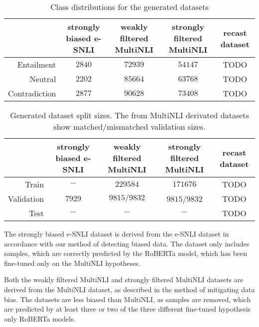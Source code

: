 \begin{table*}[ht]
    \centering
    \caption{Class distributions for the generated datasets}
    \begin{tabular}{r || c | c | c | c}
        & strongly biased \acs{e-SNLI} & weakly filtered \acs{MultiNLI} & strongly filtered \acs{MultiNLI} & recast dataset \\
        \hline
      Entailment & $2840$ & $72939$ & $54147$ & TODO\\
      Neutral & $2202$ & $85664$ & $63768$ & TODO\\
      Contradiction & $2877$ & $90628$ & $73408$ & TODO
    \end{tabular}
    \label{tab:internal_datasets:classes}
\end{table*}

\begin{table*}[h]
    \centering
    \caption{Generated dataset split sizes. The from \acs{MultiNLI} derivated datasets show matched/mismatched validation sizes.}
    \begin{tabular}{r || c | c | c | c}
        & strongly biased \acs{e-SNLI} & weakly filtered \acs{MultiNLI} & strongly filtered \acs{MultiNLI} & recast dataset \\
        \hline
      Train & $ - $ & $229584$ & $171676$ & TODO \\
      Validation & $7929$ & $9815/9832$ & $9815$/$9832$ & TODO \\
      Test & $ - $ & $ - $ & $ - $ & TODO
    \end{tabular}
    \label{tab:internal_datasets:sizes}
\end{table*}

The strongly biased \acs{e-SNLI} dataset is derived from the \acs{e-SNLI} dataset in accordance with our method of detecting biased data. The dataset only includes samples, which are correctly predicted by the \acs{RoBERTa} model, which has been fine-tuned only on the \acs{MultiNLI} hypotheses.

Both the weakly filtered \acs{MultiNLI} and strongly filtered \acs{MultiNLI} datasets are derived from the \acs{MultiNLI} dataset, as described in the method of mitigating data bias. The datasets are less biased than \acs{MultiNLI}, as samples are removed, which are predicted by at least three or two of the three different fine-tuned hypothesis only \acs{RoBERTa} models.

